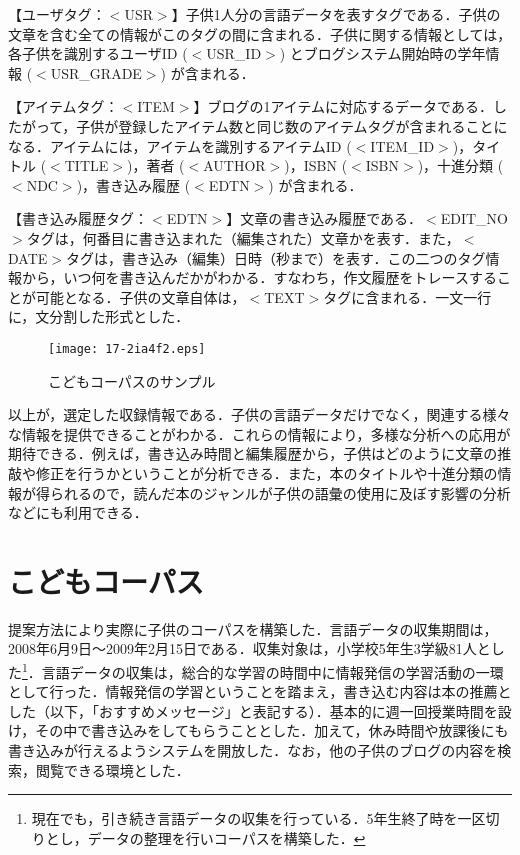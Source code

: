\documentclass[japanese]{jnlp_1.4}
\begin{document}
  
  【ユーザタグ：$<$USR$>$】子供1人分の言語データを表すタグである．子供の文章を含む全ての情報がこのタグの間に含まれる．子供に関する情報としては，各子供を識別するユーザID ($<$USR\_ID$>$) とブログシステム開始時の学年情報 ($<$USR\_GRADE$>$) が含まれる．


  【アイテムタグ：$<$ITEM$>$】ブログの1アイテムに対応するデータである．したがって，子供が登録したアイテム数と同じ数のアイテムタグが含まれることになる．アイテムには，アイテムを識別するアイテムID ($<$ITEM\_ID$>$)，タイトル ($<$TITLE$>$)，著者 ($<$AUTHOR$>$)，ISBN ($<$ISBN$>$)，十進分類 ($<$NDC$>$)，書き込み履歴 ($<$EDTN$>$) が含まれる．


  【書き込み履歴タグ：$<$EDTN$>$】文章の書き込み履歴である．$<$EDIT\_NO$>$タグは，何番目に書き込まれた（編集された）文章かを表す．また，$<$DATE$>$タグは，書き込み（編集）日時（秒まで）を表す．この二つのタグ情報から，いつ何を書き込んだかがわかる．すなわち，作文履歴をトレースすることが可能となる．子供の文章自体は，$<$TEXT$>$タグに含まれる．一文一行に，文分割した形式とした．


\begin{figure}[t]
\begin{center}
\texttt{[image: 17-2ia4f2.eps]}
\end{center}
\caption{こどもコーパスのサンプル}\label{fig:sample}
\end{figure}


  以上が，選定した収録情報である．子供の言語データだけでなく，関連する様々な情報を提供できることがわかる．これらの情報により，多様な分析への応用が期待できる．例えば，書き込み時間と編集履歴から，子供はどのように文章の推敲や修正を行うかということが分析できる．また，本のタイトルや十進分類の情報が得られるので，読んだ本のジャンルが子供の語彙の使用に及ぼす影響の分析などにも利用できる．



\section{こどもコーパス}\label{sec:pupil_corpus}

  提案方法により実際に子供のコーパスを構築した．言語データの収集期間は，2008年6月9日〜2009年2月15日である．収集対象は，小学校5年生3学級81人とした\footnote{現在でも，引き続き言語データの収集を行っている．5年生終了時を一区切りとし，データの整理を行いコーパスを構築した．}．言語データの収集は，総合的な学習の時間中に情報発信の学習活動の一環として行った．情報発信の学習ということを踏まえ，書き込む内容は本の推薦とした（以下，「おすすめメッセージ」と表記する）．基本的に週一回授業時間を設け，その中で書き込みをしてもらうこととした．加えて，休み時間や放課後にも書き込みが行えるようシステムを開放した．なお，他の子供のブログの内容を検索，閲覧できる環境とした．
\end{document}
